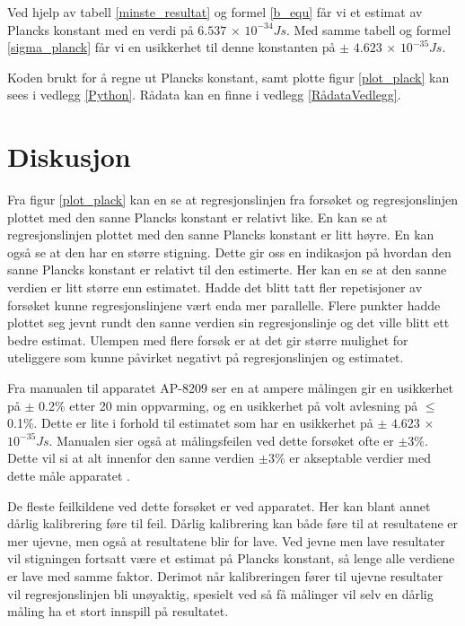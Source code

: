 \documentclass[twocolumn, 11pt]{article} %
\begin{document}
Ved hjelp av tabell \ref{minste_resultat} og formel \eqref{b_equ} får vi et estimat av Plancks konstant med en verdi på $6.537$ × $10^{-34}\textit{Js}$. Med samme tabell og formel \ref{sigma_planck} får vi en usikkerhet til denne konstanten på $\pm$ $4.623$ × $10^{-35}\textit{Js}$.

Koden brukt for å regne ut Plancks konstant, samt plotte figur \ref{plot_plack} kan sees i vedlegg \ref{Python}. Rådata kan en finne i vedlegg \ref{RådataVedlegg}.


\section{Diskusjon}

Fra figur \ref{plot_plack} kan en se at regresjonslinjen fra forsøket og regresjonslinjen plottet med den sanne Plancks konstant er relativt like. En kan se at regresjonslinjen plottet med den sanne Plancks konstant er litt høyre. En kan også se at den har en større stigning. Dette gir oss en indikasjon på hvordan den sanne Plancks konstant er relativt til den estimerte. Her kan en se at den sanne verdien er litt større enn estimatet. Hadde det blitt tatt fler repetisjoner av forsøket kunne regresjonslinjene vært enda mer parallelle. Flere punkter hadde plottet seg jevnt rundt den sanne verdien sin regresjonslinje og det ville blitt ett bedre estimat. Ulempen med flere forsøk er at det gir større mulighet for uteliggere som kunne påvirket negativt på regresjonslinjen og estimatet.
 
Fra manualen til apparatet AP-8209 ser en at ampere målingen gir en usikkerhet på $\pm$ 0.2\% etter 20 min oppvarming, og en usikkerhet på volt avlesning på $\leq$ 0.1\%. Dette er lite i forhold til estimatet som har en usikkerhet på $\pm$ $4.623$ × $10^{-35}\textit{Js}$. Manualen sier også at målingsfeilen ved dette forsøket ofte er $\pm 3\%$. Dette vil si at alt innenfor den sanne verdien $\pm 3\%$ er akseptable verdier med dette måle apparatet \cite{AP-8209}.

De fleste feilkildene ved dette forsøket er ved apparatet. Her kan blant annet dårlig kalibrering føre til feil. Dårlig kalibrering kan både føre til at resultatene er mer ujevne, men også at resultatene blir for lave. Ved jevne men lave resultater vil stigningen fortsatt være et estimat på Plancks konstant, så lenge alle verdiene er lave med samme faktor. Derimot når kalibreringen fører til ujevne resultater vil regresjonslinjen bli unøyaktig, spesielt ved så få målinger vil selv en dårlig måling ha et stort innspill på resultatet. 
\end{document}
